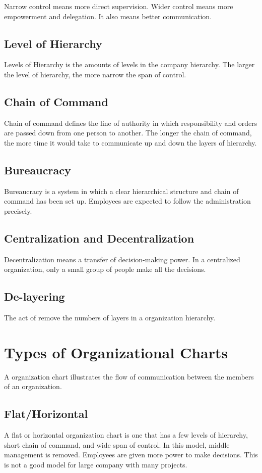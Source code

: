 \documentclass{report}
\begin{document}
Narrow control means more direct supervision.
Wider control means more empowerment and delegation.
It also means better communication.

\subsection{Level of Hierarchy}
Levels of Hierarchy is the amounts of levels in the company hierarchy.
The larger the level of hierarchy, the more narrow the span of control.

\subsection{Chain of Command}
Chain of command defines the line of authority in which responsibility and orders are passed down from one person to another.
The longer the chain of command, the more time it would take to communicate up and down the layers of hierarchy.

\subsection{Bureaucracy}
Bureaucracy is a system in which a clear hierarchical structure and chain of command has been set up.
Employees are expected to follow the administration precisely.

\subsection{Centralization and Decentralization}
Decentralization means a transfer of decision-making power.
In a centralized organization, only a small group of people make all the decisions.

\subsection{De-layering}
The act of remove the numbers of layers in a organization hierarchy.

\section{Types of Organizational Charts}
A organization chart illustrates the flow of communication between the members of an organization.

\subsection{Flat/Horizontal}
A flat or horizontal organization chart is one that has a few levels of hierarchy, short chain of command, and wide span of control.
In this model, middle management is removed.
Employees are given more power to make decisions.
This is not a good model for large company with many projects.
\end{document}
